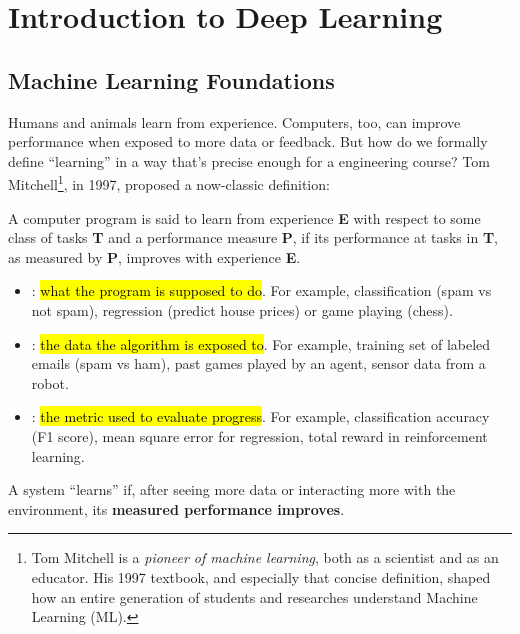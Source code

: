 \section{Introduction to Deep Learning}

\subsection{Machine Learning Foundations}

Humans and animals learn from experience. Computers, too, can improve performance when exposed to more data or feedback. But how do we formally define ``learning'' in a way that's precise enough for a engineering course? Tom Mitchell\footnote{%
    Tom Mitchell is a \emph{pioneer of machine learning}, both as a scientist and as an educator. His 1997 textbook, and especially that concise definition, shaped how an entire generation of students and researches understand Machine Learning (ML).
}, in 1997, proposed a now-classic definition:
\begin{definitionbox}
    A computer program is said to learn from experience \textbf{E} with respect to some class of tasks \textbf{T} and a performance measure \textbf{P}, if its performance at tasks in \textbf{T}, as measured by \textbf{P}, improves with experience \textbf{E}.
\end{definitionbox}
\begin{itemize}
    \item {}: \hl{what the program is supposed to do}. For example, classification (spam vs not spam), regression (predict house prices) or game playing (chess).
    \item {}: \hl{the data the algorithm is exposed to}. For example, training set of labeled emails (spam vs ham), past games played by an agent, sensor data from a robot.
    \item {}: \hl{the metric used to evaluate progress}. For example, classification accuracy (F1 score), mean square error for regression, total reward in reinforcement learning.
\end{itemize}
A system ``learns'' if, after seeing more data or interacting more with the environment, its \textbf{measured performance improves}.

